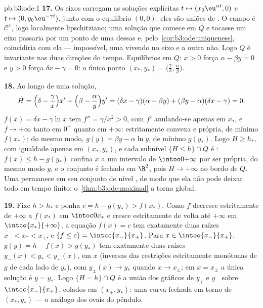 \begin{solution}{pb:b3:ode:1}
\textbf{17.} Os eixos carregam as soluções explícitas $t
\mapsto (x_0\eu^{\alpha t}, 0)$ e $t \mapsto (0,
y_0\eu^{-\gamma t})$, junto com o equilíbrio
$(0, 0)$: eles são uniões de . O campo é $\mathcal
C^1$, logo localmente lipschitziano; uma solução que comece em $Q$
e tocasse um eixo passaria por um ponto de uma
dessas  e, pelo~\cref{cor:b3:ode:uniqueness}, coincidiria
com ela --- impossível, uma vivendo no eixo e a outra
não. Logo $Q$ é invariante nas duas direções do tempo.
Equilíbrios em $Q$: $x > 0$ força $\alpha - \beta y = 0$ e
$y > 0$ força $\delta x - \gamma = 0$: o único ponto
$(x_*, y_*) = \bigl(\frac\gamma\delta,
\frac\alpha\beta\bigr)$.

\textbf{18.} Ao longo de uma solução,
\[
\dot H = \Bigl(\delta - \frac\gamma x\Bigr)x' +
\Bigl(\beta - \frac\alpha y\Bigr)y'
= (\delta x - \gamma)(\alpha - \beta y) +
(\beta y - \alpha)(\delta x - \gamma) = 0 .
\]
$f(x) = \delta x - \gamma\ln x$ tem $f'' = \gamma/x^2 > 0$, com
$f'$ anulando-se apenas em $x_*$, e $f \to +\infty$ tanto em
$0^+$ quanto em $+\infty$: estritamente convexa e própria, de mínimo
$f(x_*)$; do mesmo modo, $g(y) = \beta y - \alpha\ln y$, de mínimo
$g(y_*)$. Logo $H \geq h_*$, com igualdade apenas em $(x_*,
y_*)$, e cada subnível $\{H \leq h\}\cap Q$ é :
$f(x) \leq h - g(y_*)$ confina $x$ a um intervalo  de
$\intoo0{+\infty}$ por ser própria, do mesmo modo $y$, e o conjunto
é fechado em $\R^2$, pois $H \to +\infty$ no bordo de
$Q$. Uma  permanece em seu conjunto de nível , de modo que
ela não pode deixar todo  em tempo finito:
o~\cref{thm:b3:ode:maximal} a torna global.

\textbf{19.} Fixe $h > h_*$ e ponha $c = h - g(y_*) >
f(x_*)$. Como $f$ decresce estritamente de $+\infty$ a
$f(x_*)$ em $\intoc0{x_*}$ e cresce estritamente de volta até
$+\infty$ em $\intco{x_*}{+\infty}$, a equação $f(x) = c$
tem exatamente duas raízes $x_- < x_* < x_+$, e $\{f \leq c\} =
\intcc{x_-}{x_+}$. Para $x \in \intoo{x_-}{x_+}$: $g(y) = h -
f(x) > g(y_*)$ tem exatamente duas raízes $y_-(x) < y_* <
y_+(x)$,  em $x$ (inversas das restrições
 estritamente monótonas de $g$ de cada lado de
$y_*$), com $y_\pm(x) \to y_*$ quando $x \to x_\pm$; em $x =
x_\pm$ a única solução é $y = y_*$. Logo $\{H = h\}\cap
Q$ é a união dos gráficos de $y_+$ e $y_-$ sobre
$\intcc{x_-}{x_+}$, colados em $(x_\pm, y_*)$: uma curva fechada
em torno de $(x_*, y_*)$ --- o análogo dos ovais do
pêndulo.


\end{solution}
